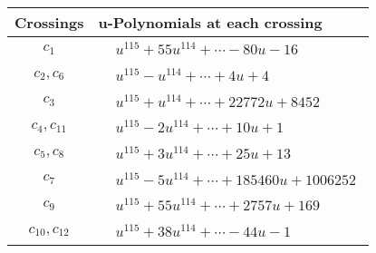 \documentclass[1p]{elsarticle_modified}
\theoremstyle{definition}
\begin{document}
\begin{tabular}{m{50pt}|m{274pt}}
Crossings & \hspace{64pt}u-Polynomials at each crossing \\
\hline $$\begin{aligned}c_{1}\end{aligned}$$&$\begin{aligned}
&u^{115}+55 u^{114}+\cdots-80 u-16
\end{aligned}$\\
\hline $$\begin{aligned}c_{2},c_{6}\end{aligned}$$&$\begin{aligned}
&u^{115}- u^{114}+\cdots+4 u+4
\end{aligned}$\\
\hline $$\begin{aligned}c_{3}\end{aligned}$$&$\begin{aligned}
&u^{115}+u^{114}+\cdots+22772 u+8452
\end{aligned}$\\
\hline $$\begin{aligned}c_{4},c_{11}\end{aligned}$$&$\begin{aligned}
&u^{115}-2 u^{114}+\cdots+10 u+1
\end{aligned}$\\
\hline $$\begin{aligned}c_{5},c_{8}\end{aligned}$$&$\begin{aligned}
&u^{115}+3 u^{114}+\cdots+25 u+13
\end{aligned}$\\
\hline $$\begin{aligned}c_{7}\end{aligned}$$&$\begin{aligned}
&u^{115}-5 u^{114}+\cdots+185460 u+1006252
\end{aligned}$\\
\hline $$\begin{aligned}c_{9}\end{aligned}$$&$\begin{aligned}
&u^{115}+55 u^{114}+\cdots+2757 u+169
\end{aligned}$\\
\hline $$\begin{aligned}c_{10},c_{12}\end{aligned}$$&$\begin{aligned}
&u^{115}+38 u^{114}+\cdots-44 u-1
\end{aligned}$\\
\hline
\end{tabular}\\~\\
\end{document}
